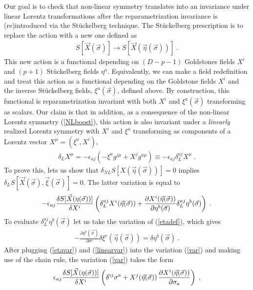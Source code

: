 \documentclass[%
 reprint,
 amsmath,amssymb,
 aps,
]{revtex4-1}
\begin{document}
Our goal is to check that non-linear symmetry translates into an invariance under linear Lorentz transformations after the
reparametrization invariance is (re)introduced via the St\"uckelberg technique.
The  St\"uckelberg prescription is to replace the action with a new
one defined as
\begin{eqnarray}
    S[\vec{X}(\vec{\sigma})] \rightarrow S[\vec{X}(\vec{\eta}(\vec{\sigma}))] \; . \nonumber
\end{eqnarray}
This new action is a functional depending on $(D-p-1)$ Goldstones fields $X^i$ and $(p+1)$ St\"uckelberg fields $\eta^a$.
Equivalently, we can make a field redefinition and treat  this action as a functional depending on  the Goldstone fields $X^i$ and
the inverse St\"uckelberg fields, $\xi^a(\vec{\sigma})$, defined above. By construction, this functional is reparametrization invariant with
both $X^i$ and $\xi^a(\vec{\sigma})$ transforming as scalars.
 Our claim is that in addition, as a consequence of the non-linear Lorentz symmetry (\ref{NLboost}), this action is also invariant under a {\it linearly} realized
 Lorentz symmetry with $X^i$ and $\xi^a$ transforming as components of a Lorentz vector $X^\mu=(\xi^a, X^i)$,
\begin{eqnarray}
\label{linearvar}
    \delta_{L} X^{\mu} = -\epsilon_{a j} (-\xi^a g^{j \mu} + X^j g^{a \mu} ) \equiv -\epsilon_{a j} \delta^{a j}_L X^{\mu} \; .
\end{eqnarray}
To prove this, lets us  show  that
$\delta_{NL} S[X(\vec{\eta}(\vec{\sigma}))] = 0$ implies $\delta_{L} S[\vec{X}(\vec{\sigma}),\vec{\xi}(\vec{\sigma})] = 0$.
The latter variation is equal to
\begin{gather}
\label{var}
-\epsilon_{a j} {\delta S[\vec{X}(\eta(\vec{\sigma}))]\over \delta X^i}
\left(\delta^{a j}_L X^i(\vec{\eta}(\vec{\sigma})) +
    \frac{\partial X^i (\vec{\eta}(\vec{\sigma}))}{\partial \eta^b(\vec{\sigma})}
    \delta^{a j}_L \eta^b(\vec{\sigma})\right) \; .
\end{gather}
To evaluate $\delta^{a j}_L \eta^b(\vec{\sigma})$ let us take the variation of (\ref{etadef}), which gives
\begin{eqnarray}
\label{etavar}
    - \frac{\partial \eta^b (\vec{\sigma})}{\partial \sigma^c} \delta \xi^c (\vec{\eta}(\vec{\sigma}))
    = \delta \eta^b(\vec{\sigma}) \; .
\end{eqnarray}
After plugging (\ref{etavar}) and (\ref{linearvar}) into the variation (\ref{var}) and making use of the chain rule, the variation
(\ref{var}) takes the form
\begin{eqnarray}
   \epsilon_{a j} {\delta S[\vec{X}(\eta(\vec{\sigma}))]\over \delta X^i} \left( \delta^{i j} \sigma^a + X^j(\vec{\eta}(\vec{\sigma})) \,
    \frac{\partial X^i(\vec{\eta}(\vec{\sigma}))}{\partial \sigma_a} \right) \; ,
    \nonumber
\end{eqnarray}
\end{document}
